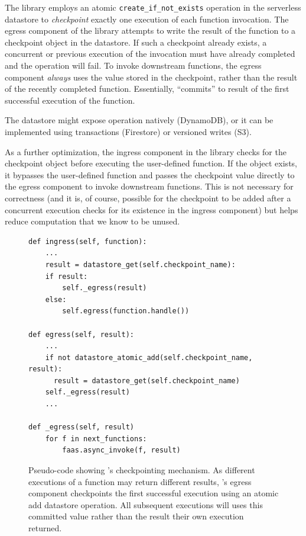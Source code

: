 The \name{} library employs an atomic \texttt{create\_if\_not\_exists} operation
in the serverless datastore to \emph{checkpoint} exactly one execution of each
function invocation. The egress component of the \name{} library attempts to
write the result of the function to a checkpoint object in the datastore. If
such a checkpoint already exists, a concurrent or previous execution of the
invocation must have already completed and the operation will fail. To invoke
downstream functions, the egress component \emph{always} uses the value stored
in the checkpoint, rather than the result of the recently completed function.
Essentially, \name{} ``commits'' to result of the first successful execution of
the function.

The datastore might expose operation natively (DynamoDB), or it can be
implemented using transactions (Firestore) or versioned writes (S3).

As a further optimization, the ingress component in the \name{} library checks
for the checkpoint object before executing the user-defined function. If the
object exists, it bypasses the user-defined function and passes the checkpoint
value directly to the egress component to invoke downstream functions. This is
not necessary for correctness (and it is, of course, possible for the checkpoint
to be added after a concurrent execution checks for its existence in the ingress
component) but helps reduce computation that we know to be unused.

\begin{figure}
\begin{verbatim}
def ingress(self, function):
    ...
    result = datastore_get(self.checkpoint_name):
    if result:
        self._egress(result)
    else:
        self.egress(function.handle())

def egress(self, result):
    ...
    if not datastore_atomic_add(self.checkpoint_name, result):
      result = datastore_get(self.checkpoint_name)
    self._egress(result)
    ...

def _egress(self, result)
    for f in next_functions:
        faas.async_invoke(f, result)
\end{verbatim}
\label{fig:design:checkpoint}
\caption{Pseudo-code showing \name{}'s checkpointing mechanism. As different
executions of a function may return different results, \name{}'s egress
component checkpoints the first successful execution using an atomic add
datastore operation. All subsequent executions will uses this committed value
rather than the result their own execution returned.}
\end{figure}

